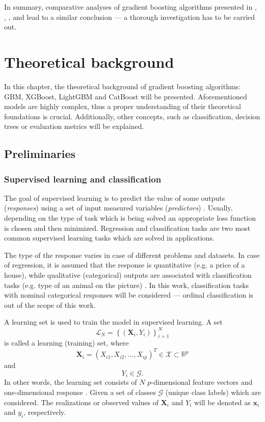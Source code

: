 \documentclass[magisterska, english]{pwr_wmat_praca_dyplomowa}
\theoremstyle{plain}
\numberwithin{theorem}{chapter}
\theoremstyle{definition}
\numberwithin{theorem}{chapter}
\newcommand{\R}{\mathbb{R}}
\newcommand{\gbm}{GBM, XGBoost, LightGBM and CatBoost }
\begin{document}
In summary, comparative analyses of gradient boosting algorithms presented in \cite{lightgbm}, \cite{catboost}, \cite{comparative_analysis}, \cite{competitive_analysis} and \cite{comparison_of} lead to a similar conclusion --- a thorough investigation has to be carried out. 

\chapter{Theoretical background}
In this chapter, the theoretical background of gradient boosting algorithms: \gbm will be presented. Aforementioned models are highly complex, thus a proper understanding of their theoretical foundations is crucial. Additionally, other concepts, such as classification, decision trees or evaluation metrics will be explained.

\section{Preliminaries}
\subsection{Supervised learning and classification}
The goal of supervised learning is to predict the value of some outputs (\emph{responses}) using a set of input measured variables (\emph{predictors}) \cite{esl}. Usually, depending on the type of task which is being solved an appropriate loss function is chosen and then minimized. Regression and classification tasks are two most common supervised learning tasks which are solved in applications.

The type of the response varies in case of different problems and datasets. In case of regression, it is assumed that the response is quantitative (e.g. a price of a house), while qualitative (categorical) outputs are associated with classification tasks (e.g. type of an animal on the picture) \cite{esl}. In this work, classification tasks with nominal categorical responses will be considered --- ordinal classification is out of the scope of this work.

A learning set is used to train the model in supervised learning. A set
\begin{equation}
    \mathcal{L}_N = \left\{(\mathbf{X}_i, Y_i)\right\}_{i=1}^N
\end{equation}
is called a learning (training) set, where 
\begin{equation}
    \mathbf{X}_i = (X_{i1}, X_{i2}, \ldots, X_{ip})^T \in \mathcal{X}\subset \R^p
\end{equation}
and 
\begin{equation}
    Y_i\in \mathcal{G}.
\end{equation}
In other words, the learning set consists of $N$ $p$-dimensional feature vectors and one-dimensional response \cite{uczenie}. Given a set of classes $\mathcal{G}$ (unique class labels) which are considered. The realizations or observed values of $\mathbf{X}_i$ and $Y_i$ will be denoted as $\mathbf{x}_i$ and $y_i$, respectively.
\end{document}
